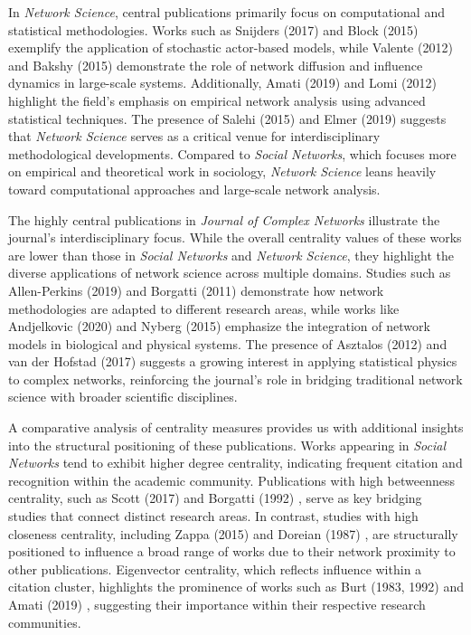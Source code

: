 \documentclass[twocolumn]{article}
\begin{document}
		In \textit{Network Science}, central publications primarily focus on computational and statistical methodologies. Works such as Snijders (2017) \cite{Snijders2017} and Block (2015) \cite{Block2015} exemplify the application of stochastic actor-based models, while Valente (2012) \cite{Valente2012} and Bakshy (2015) \cite{Bakshy2015} demonstrate the role of network diffusion and influence dynamics in large-scale systems. Additionally, Amati (2019) \cite{Amati2019} and Lomi (2012) \cite{Lomi2012} highlight the field’s emphasis on empirical network analysis using advanced statistical techniques. The presence of Salehi (2015) \cite{Salehi2015} and Elmer (2019) \cite{Elmer2019} suggests that \textit{Network Science} serves as a critical venue for interdisciplinary methodological developments. Compared to \textit{Social Networks}, which focuses more on empirical and theoretical work in sociology, \textit{Network Science} leans heavily toward computational approaches and large-scale network analysis.
		
		The highly central publications in \textit{Journal of Complex Networks} illustrate the journal’s interdisciplinary focus. While the overall centrality values of these works are lower than those in \textit{Social Networks} and \textit{Network Science}, they highlight the diverse applications of network science across multiple domains. Studies such as Allen-Perkins (2019) \cite{AllenPerkins2019} and Borgatti (2011) \cite{Borgatti1992} demonstrate how network methodologies are adapted to different research areas, while works like Andjelkovic (2020) \cite{Andjelkovic2020} and Nyberg (2015) \cite{Nyberg2015} emphasize the integration of network models in biological and physical systems. The presence of Asztalos (2012) \cite{Asztalos2012} and van der Hofstad (2017) \cite{vanDerHofstad2017} suggests a growing interest in applying statistical physics to complex networks, reinforcing the journal’s role in bridging traditional network science with broader scientific disciplines.
		
		A comparative analysis of centrality measures provides us with additional insights into the structural positioning of these publications. Works appearing in \textit{Social Networks} tend to exhibit higher degree centrality, indicating frequent citation and recognition within the academic community. Publications with high betweenness centrality, such as Scott (2017) \cite{Scott2017} and Borgatti (1992) \cite{Borgatti1992}, serve as key bridging studies that connect distinct research areas. In contrast, studies with high closeness centrality, including Zappa (2015) \cite{Zappa2015} and Doreian (1987) \cite{Doreian1987}, are structurally positioned to influence a broad range of works due to their network proximity to other publications. Eigenvector centrality, which reflects influence within a citation cluster, highlights the prominence of works such as Burt (1983, 1992) \cite{Burt1983,Burt1992} and Amati (2019) \cite{Amati2019}, suggesting their importance within their respective research communities.
		
\end{document}
